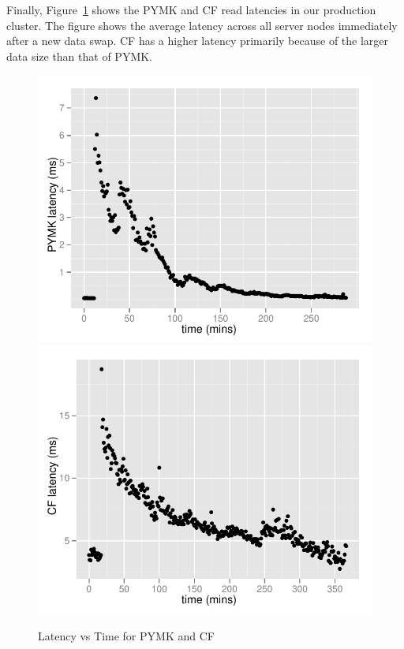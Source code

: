 Finally, Figure~\ref{production} shows the PYMK and CF read latencies
in our production cluster. The figure shows the average latency across
all server nodes immediately after a new data swap. CF has a higher
latency primarily because of the larger data size than that of PYMK.

\begin{figure}
  \centering
    \includegraphics[scale=0.55]{images/pymk_search.pdf}
    \includegraphics[scale=0.55]{images/browsemap_search.pdf}
  \caption{Latency vs Time for PYMK and CF}
  \label{production}
\end{figure}

